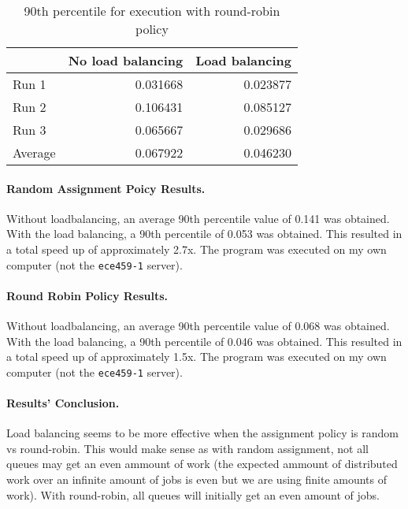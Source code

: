 \documentclass[12pt]{article}
\begin{document}
\begin{table}[H]
  \centering
  \begin{tabular}{lrr}
    & {\bf No load balancing} & {\bf Load balancing}} \\
    \hline
    Run 1 & 0.031668 & 0.023877 \\
    Run 2 & 0.106431 & 0.085127 \\
    Run 3 & 0.065667 & 0.029686 \\
    \hline
    Average & 0.067922 & 0.046230 \\
  \end{tabular}
  \caption{90th percentile for execution with round-robin policy}
  \label{tbl-part2-loadbalance}
\end{table}

\paragraph{Random Assignment Poicy Results.} Without loadbalancing, an average 90th percentile value of 0.141 was obtained. With the load balancing, a 90th percentile of 0.053 was obtained. This resulted in a total speed up of approximately 2.7x. The program was executed on my own computer (not the {\tt ece459-1} server).

\paragraph{Round Robin Policy Results.} Without loadbalancing, an average 90th percentile value of 0.068 was obtained. With the load balancing, a 90th percentile of 0.046 was obtained. This resulted in a total speed up of approximately 1.5x. The program was executed on my own computer (not the {\tt ece459-1} server).

\paragraph{Results' Conclusion.} Load balancing seems to be more effective when the assignment policy is random vs round-robin. This would make sense as with random assignment, not all queues may get an even ammount of work (the expected ammount of distributed work over an infinite amount of jobs is even but we are using finite amounts of work). With round-robin, all queues will initially get an even amount of jobs.
\end{document}
